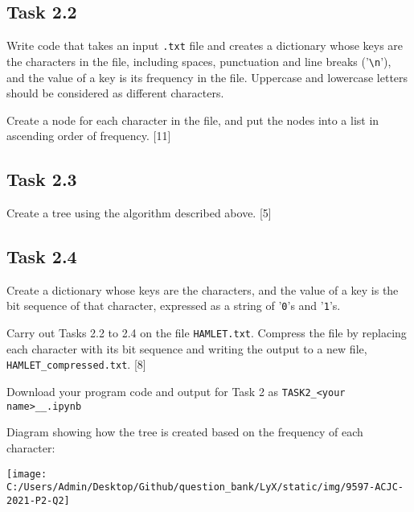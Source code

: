 \subsection*{Task 2.2}

\noindent Write code that takes an input \texttt{.txt} file and creates
a dictionary whose keys are the characters in the file, including
spaces, punctuation and line breaks ('\texttt{\textbackslash n}'),
and the value of a key is its frequency in the file. Uppercase and
lowercase letters should be considered as different characters.

\noindent Create a node for each character in the file, and put the
nodes into a list in ascending order of frequency. \hfill{}{[}11{]}

\subsection*{Task 2.3}

\noindent Create a tree using the algorithm described above. \hfill{}{[}5{]}

\subsection*{Task 2.4}

\noindent Create a dictionary whose keys are the characters, and the
value of a key is the bit sequence of that character, expressed as
a string of '\texttt{0}'s and '\texttt{1}'s.

\noindent Carry out Tasks 2.2 to 2.4 on the file \texttt{HAMLET.txt}.
Compress the file by replacing each character with its bit sequence
and writing the output to a new file, \texttt{HAMLET\_compressed.txt}.
{[}8{]}

\noindent Download your program code and output for Task 2 as \texttt{TASK2\_<your
name>\_<centre number>\_<index number>.ipynb} 

\noindent Diagram showing how the tree is created based on the frequency
of each character: 
\noindent \begin{center}
\texttt{[image: C:/Users/Admin/Desktop/Github/question\_bank/LyX/static/img/9597-ACJC-2021-P2-Q2]}\quad{}
\par\end{center}